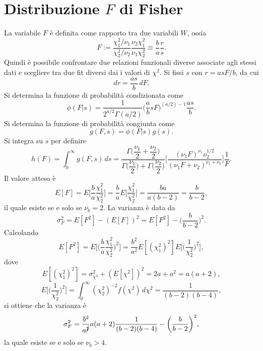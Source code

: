 \documentclass{article}
\theoremstyle{remark}
\begin{document}
\section{Distribuzione \texorpdfstring{$F$}{F} di Fisher}
La variabile $F$ è definita come rapporto tra due variabili $W$, ossia 
\begin{equation}
    F := \frac{\chi_1^2/\nu_1}{\chi_2^2/\nu_2}\frac{\nu_2\chi_1^2}{\nu_1\chi_2^2} \equiv \frac{b}{a}\frac{r}{s}.
\end{equation}
Quindi è possibile confrontare due relazioni funzionali diverse associate agli stessi dati e scegliere tra due fit diversi dai i valori di $\chi^2$. Si fissi $s$ con $r = asF/b$, da cui
\begin{equation}
    dr = \frac{as}{b}\,dF.
\end{equation}
Si determina la funzione di probabilità condizionata come
\begin{equation}
    \phi(F|s) = \frac{1}{2^{a/2}\Gamma(a/2)}\bigg(\frac{a}{b}sF\bigg)^{(a/2) - 1}\frac{as}{b}.
\end{equation}
Si determina la funzione di probabilità congiunta come
\begin{equation}
    g(F,s) = \phi(F|s)g(s).
\end{equation}
Si integra su $s$ per definire
\begin{equation}
    h(F) = \int_0^\infty g(F,s)\,ds = \frac{\Gamma\bigg(\dfrac{\nu_1}{2} + \dfrac{\nu_2}{2}\bigg)}{\Gamma\bigg(\dfrac{\nu_1}{2}\bigg) + \Gamma\bigg(\dfrac{\nu_2}{2}\bigg)}\bigg[\frac{(\nu_1F)^{\nu_1}\nu_2^{1/2}}{(\nu_1F + \nu_2)^{\nu_1 + \nu_2}}\bigg]\frac{1}{F}.
\end{equation}
Il valore atteso è
\begin{equation}
    E[F] = E\bigg[\frac{b}{a}\frac{\chi_1^2}{\chi_2^2}\bigg] = \frac{b}{a}E\bigg[\frac{\chi_1^2}{\chi_2^2}\bigg] = \frac{ba}{a(b - 2)} = \frac{b}{b - 2},
\end{equation}
il quale esiste se e solo se $\nu_b = 2$. La varianza è data da
\begin{equation}
    \sigma_F^2 = E[F^2] - (E[F])^2 = E[F^2] - \bigg(\frac{b}{b - 2}\bigg)^2.
\end{equation}
Calcolando
\begin{equation}
    E[F^2] = E\bigg[\bigg(\frac{b}{a}\frac{\chi_1^2}{\chi_2^2}\bigg)^2\bigg] = \frac{b^2}{a^2}E[(\chi_1^2)^2]E\bigg[\bigg(\frac{1}{\chi_2^2}\bigg)^2\bigg],
\end{equation}
dove 
\begin{equation}
    E[(\chi_1^2)^2] = \sigma_{\chi^2}^2 + (E[\chi^2])^2 = 2a + a^2 = a(a + 2),
\end{equation}
\begin{equation}
    E\bigg[\bigg(\frac{1}{\chi_2^2}\bigg)^2\bigg] = \int_0^\infty(\chi_2^2)^{-2}f(\chi^2)\,d\chi^2 = \frac{1}{(b - 2)(b - 4)},
\end{equation}
si ottiene che la varianza è
\begin{equation}
    \sigma_F^2 = \frac{b^2}{a^{\cancel{2}}}a(a + 2)\frac{1}{(b - 2)(b - 4)} - \bigg(\frac{b}{b - 2}\bigg)^2,
\end{equation}
la quale esiste se e solo se $\nu_b > 4$.
\end{document}
